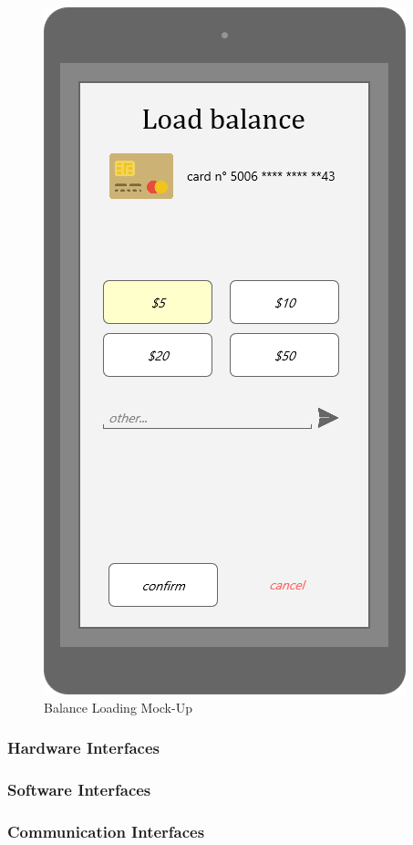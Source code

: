\documentclass{article}
\begin{document}
\begin{figure}[H]
\centering
\includegraphics[width=0.2\linewidth]{07-Credit_card_balance_loading.png}
\caption{Balance Loading Mock-Up}
\label{fig:MU16}
\end{figure}

\subsubsection{Hardware Interfaces}
\subsubsection{Software Interfaces}
\subsubsection{Communication Interfaces}
\end{document}
